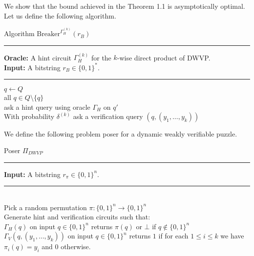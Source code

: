 We show that the bound achieved in the Theorem 1.1 is asymptotically optimal.
Let us define the following algorithm.


\begin{codeblock}
  Algorithm $\text{Breaker}^{\Gamma_H^{(k)}}(r_B)$
  \medskip \hrule \medskip
  \textbf{Oracle:}  A hint circuit $\Gamma_H^{(k)}$ for the $k$-wise direct product of DWVP. \\
  \textbf{Input:}  A bitstring $r_B \in \{0,1\}^{*}$.
  \medskip\hrule\medskip
  $q \leftarrow Q$ \\
  \For all $q \in Q \setminus \{q\}$ \Do \\
  \IndI ask a hint query using oracle $\Gamma_H$ on $q'$ \\
  With probability $\delta^{(k)}$ ask a verification query $(q,(y_1, \dotsc, y_k))$
\end{codeblock}

We define the following problem poser for a dynamic weakly verifiable puzzle.

\begin{codeblock}
  Poser $\Pi_{DWVP}$ \\
  \medskip\hrule\medskip
  \textbf{Input:} A bitstring $r_{\pi} \in \{0,1\}^{n}$. \\
  \medskip\hrule\medskip
  \IndI \\
  Pick a random permutation $\pi: \{0,1\}^{n} \rightarrow \{0,1\}^{n}$ \\
  Generate hint and verification circuits such that: \\
  $\Gamma_H(q)$ on input $q \in \{0,1\}^{n}$ returns $\pi(q)$ or $\bot$ if $q \notin \{0,1\}^{n}$ \\
  $\Gamma_V(q,(y_1, \dotsc, y_k))$ on input $q \in \{0,1\}^{n}$ returns $1$ if for each $1 \leq i \leq k$
  we have $\pi_i(q) = y_i$ and $0$ otherwise.\\
\end{codeblock}


